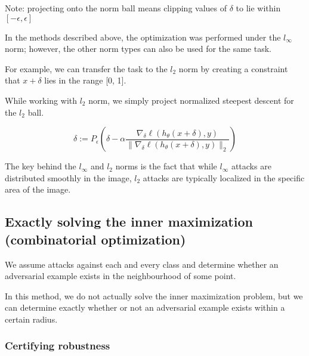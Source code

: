Note: projecting onto the norm ball means clipping values of $\delta$ to lie within $[-\epsilon, \epsilon]$

In the methods described above, the optimization was performed under the $l_{\infty}$ norm; however, 
the other norm types can also be used for the same task.

For example, we can transfer the task to the $l_2$ norm by creating a constraint that $x+\delta$ lies in the range [0, 1].

While working with $l_2$ norm, we simply project normalized steepest descent for the $l_2$ ball. 

\[\delta := P_{\epsilon}\left(\delta - \alpha \frac{\nabla_{\delta} \ell(h_{\theta}(x + \delta), y)}{\|\nabla_{\delta} \ell(h_{\theta}(x + \delta), y)\|_2}\right)\]

The key behind the $l_\infty$ and $l_2$ norms is the fact that while $l_\infty$ attacks are distributed smoothly in the image, 
$l_2$ attacks are typically localized in the specific area of the image. 




\subsection{Exactly solving the inner maximization (combinatorial optimization)}

We assume attacks against each and every class and determine whether an 
adversarial example exists in the neighbourhood of some point.

In this method, we do not actually solve the inner maximization problem, but we can determine exactly whether or not an adversarial
example exists within a certain radius. 

\subsubsection{Certifying robustness}




